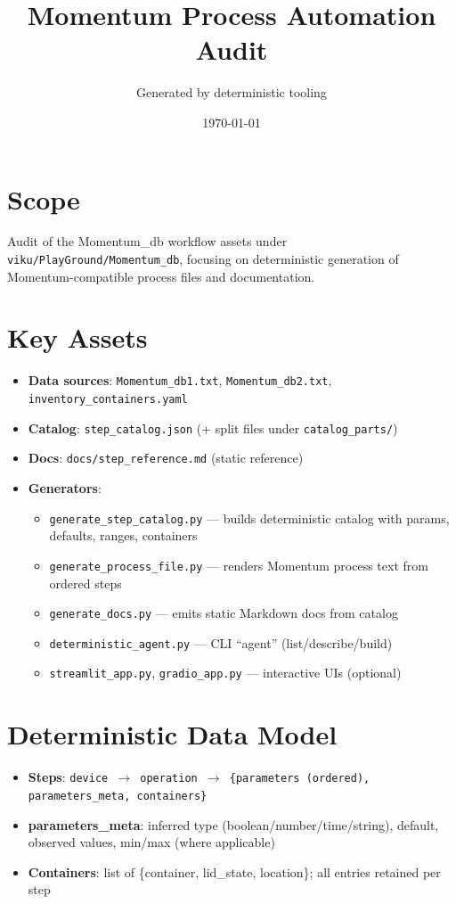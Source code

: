 \documentclass[11pt]{article}
\title{Momentum Process Automation Audit}
\author{Generated by deterministic tooling}
\date{\today}
\begin{document}
\maketitle

\section{Scope}
Audit of the Momentum\_db workflow assets under \texttt{viku/PlayGround/Momentum\_db}, focusing on deterministic generation of Momentum-compatible process files and documentation.

\section{Key Assets}
\begin{itemize}[leftmargin=*]
  \item \textbf{Data sources}: \texttt{Momentum\_db1.txt}, \texttt{Momentum\_db2.txt}, \texttt{inventory\_containers.yaml}
  \item \textbf{Catalog}: \texttt{step\_catalog.json} (+ split files under \texttt{catalog\_parts/})
  \item \textbf{Docs}: \texttt{docs/step\_reference.md} (static reference)
  \item \textbf{Generators}:
    \begin{itemize}[leftmargin=*]
      \item \texttt{generate\_step\_catalog.py} --- builds deterministic catalog with params, defaults, ranges, containers
      \item \texttt{generate\_process\_file.py} --- renders Momentum process text from ordered steps
      \item \texttt{generate\_docs.py} --- emits static Markdown docs from catalog
      \item \texttt{deterministic\_agent.py} --- CLI “agent” (list/describe/build)
      \item \texttt{streamlit\_app.py}, \texttt{gradio\_app.py} --- interactive UIs (optional)
    \end{itemize}
\end{itemize}

\section{Deterministic Data Model}
\begin{itemize}[leftmargin=*]
  \item \textbf{Steps}: \texttt{device $\to$ operation $\to$ \{parameters (ordered), parameters\_meta, containers\}}
  \item \textbf{parameters\_meta}: inferred type (boolean/number/time/string), default, observed values, min/max (where applicable)
  \item \textbf{Containers}: list of \{container, lid\_state, location\}; all entries retained per step
\end{itemize}
\end{document}
